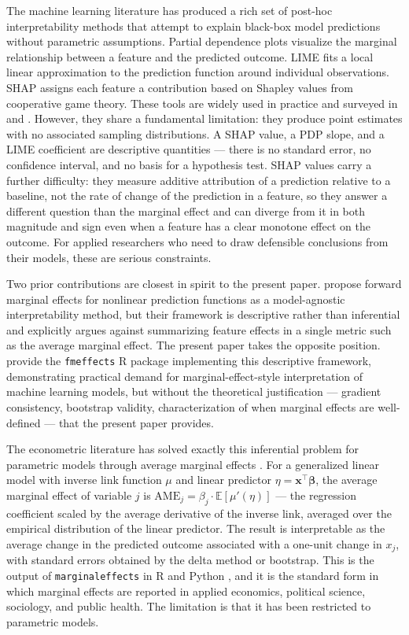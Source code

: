 \documentclass[conference]{IEEEtran}
\begin{document}
	The machine learning literature has produced a rich set of post-hoc interpretability methods that attempt to explain black-box model predictions without parametric assumptions. Partial dependence plots \cite{friedman2001pdp} visualize the marginal relationship between a feature and the predicted outcome. LIME \cite{ribeiro2016lime} fits a local linear approximation to the prediction function around individual observations. SHAP \cite{lundberg2017shap} assigns each feature a contribution based on Shapley values from cooperative game theory. These tools are widely used in practice and surveyed in \cite{molnar2025} and \cite{doshivelez2017interpretability}. However, they share a fundamental limitation: they produce point estimates with no associated sampling distributions. A SHAP value, a PDP slope, and a LIME coefficient are descriptive quantities --- there is no standard error, no confidence interval, and no basis for a hypothesis test. SHAP values carry a further difficulty: they measure additive attribution of a prediction relative to a baseline, not the rate of change of the prediction in a feature, so they answer a different question than the marginal effect and can diverge from it in both magnitude and sign even when a feature has a clear monotone effect on the outcome. For applied researchers who need to draw defensible conclusions from their models, these are serious constraints.
	
	Two prior contributions are closest in spirit to the present paper. \cite{scholbeck2024fme} propose forward marginal effects for nonlinear prediction functions as a model-agnostic interpretability method, but their framework is descriptive rather than inferential and explicitly argues against summarizing feature effects in a single metric such as the average marginal effect. The present paper takes the opposite position. \cite{lowe2024fmeffects} provide the \texttt{fmeffects} R package implementing this descriptive framework, demonstrating practical demand for marginal-effect-style interpretation of machine learning models, but without the theoretical justification --- gradient consistency, bootstrap validity, characterization of when marginal effects are well-defined --- that the present paper provides.
	
	The econometric literature has solved exactly this inferential problem for parametric models through average marginal effects \cite{greene2012, wooldridge2010}. For a generalized linear model with inverse link function $\mu$ and linear predictor $\eta = \mathbf{x}^\top \boldsymbol{\beta}$, the average marginal effect of variable $j$ is $\mathrm{AME}_j = \beta_j \cdot \mathbb{E}[\mu'(\eta)]$ --- the regression coefficient scaled by the average derivative of the inverse link, averaged over the empirical distribution of the linear predictor. The result is interpretable as the average change in the predicted outcome associated with a one-unit change in $x_j$, with standard errors obtained by the delta method or bootstrap. This is the output of \texttt{marginaleffects} in R and Python \cite{arelbundock2024marginaleffects}, and it is the standard form in which marginal effects are reported in applied economics, political science, sociology, and public health. The limitation is that it has been restricted to parametric models.
	
\end{document}
